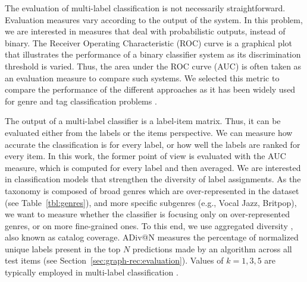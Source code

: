 The evaluation of multi-label classification is not necessarily straightforward. 
Evaluation measures vary according to the output of the system. 
In this problem, we are interested in measures that deal with probabilistic outputs, instead of binary. 
The Receiver Operating Characteristic (ROC) curve is a graphical plot that illustrates the performance of a binary classifier system as its discrimination threshold is varied. 
Thus, the area under the ROC curve (AUC) is often taken as an evaluation measure to compare such systems. 
We selected this metric to compare the performance of the different approaches as it has been widely used for genre and tag classification problems \citep{Choi2016,dieleman2014end}. 

The output of a multi-label classifier is a label-item matrix. 
Thus, it can be evaluated either from the labels or the items perspective. 
We can measure how accurate the classification is for every label, or how well the labels are ranked for every item. 
In this work, the former point of view is evaluated with the AUC measure, which is computed for every label and then averaged. 
We are interested in classification models that strengthen the diversity of label assignments. 
As the taxonomy is composed of broad genres which are over-represented in the dataset (see Table~\ref{tbl:genres}), and more specific subgenres (e.g., Vocal Jazz, Britpop), we want to measure whether the classifier is focusing only on over-represented genres, or on more fine-grained ones.
To this end, we use aggregated diversity \citep{adomavicius2012improving}, also known as catalog coverage.%
ADiv@N measures the percentage of normalized unique labels present in the top $N$ predictions made by an algorithm across all test items (see Section~\ref{sec:graph-rec:evaluation}). Values of $k = 1, 3, 5$ are typically employed in multi-label classification \citep{jain2016extreme} .

